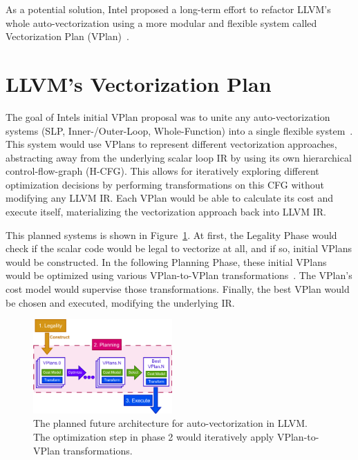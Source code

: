 \documentclass[sigplan,11pt,nonacm]{acmart}
\begin{document}
As a potential solution, Intel proposed a long-term effort to refactor LLVM's whole auto-vectorization
using a more modular and flexible system called Vectorization Plan (VPlan)~\cite{llvmextloopvec}.




\section{LLVM's Vectorization Plan}
\label{sec:vplan}

The goal of Intels initial VPlan proposal was to unite any 
auto-vectorization systems (SLP, Inner-/Outer-Loop, Whole-Function) into a single flexible
system~\cite{llvmextloopvec,llvmintrvplan,llvmvplanstate}. 
This system would use VPlans to represent different 
vectorization approaches, abstracting away from the underlying scalar loop IR by using its own 
hierarchical control-flow-graph (H-CFG). This allows for iteratively exploring different 
optimization decisions by performing transformations on this CFG without modifying any LLVM IR.
Each VPlan would be able to calculate its cost and execute itself, materializing the vectorization 
approach back into LLVM IR.

This planned systems is shown in Figure~\ref{fig:vplan-future}. At first, the Legality 
Phase would check if the scalar code would be legal to vectorize at all, and if so, 
initial VPlans would be constructed. In the following Planning Phase, these initial 
VPlans would be optimized using various VPlan-to-VPlan transformations~\cite{llvmouterloopstatus}. 
The VPlan's cost model would supervise those transformations. Finally, the best VPlan 
would be chosen and executed, modifying the underlying IR.

\begin{figure}
  \centering
  \includegraphics[width=0.475\textwidth]{images/vplan-future.png}
  \caption{The planned future architecture for auto-vectorization in LLVM. The 
  optimization step in phase 2 would iteratively apply VPlan-to-VPlan transformations.}
  \label{fig:vplan-future}
\end{figure}
\end{document}
